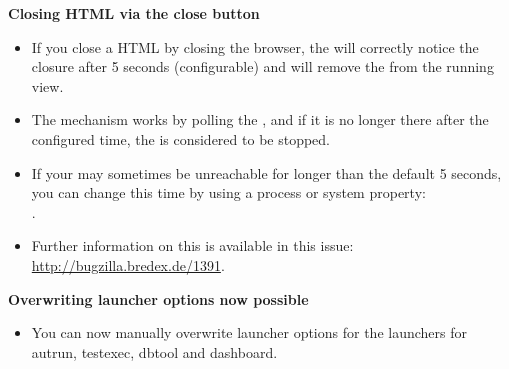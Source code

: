 \textbf{Closing HTML \gdauts{} via the close button}
\begin{itemize}
\item If you close a HTML \gdaut{} by closing the browser, the \ite{} will correctly notice the closure after 5 seconds (configurable) and will remove the \gdaut{} from the running \gdauts{} view.
\item The mechanism works by polling the \gdaut{}, and if it is no longer there after the configured time, the \gdaut{} is considered to be stopped.
\item If your \gdaut{} may sometimes be unreachable for longer than the default 5 seconds, you can change this time by using a process or system property:\\
.
\item Further information on this is available in this issue:\\
\url{http://bugzilla.bredex.de/1391}.
\end{itemize}

\textbf{Overwriting launcher options now possible}
\begin{itemize}
\item You can now manually overwrite launcher options for the launchers for autrun, testexec, dbtool and dashboard.
\end{itemize}
